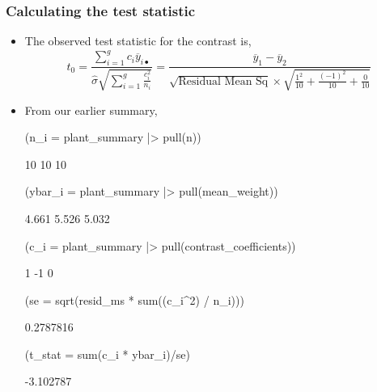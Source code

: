 \documentclass[a4paper]{article}\usepackage[]{graphicx}\usepackage[]{xcolor}
\begin{document}
\subsubsection{Calculating the test statistic}
\begin{itemize}
	\item The observed test statistic for the contrast is,
	\[
		t_0 = \frac{\sum_{i=1}^gc_i\overline y_{i\bullet}}{\hat\sigma\sqrt{\sum_{i=1}^g \frac{c_i^2}{n_i}}} = \frac{\overline{y}_1 - \overline{y}_2 }{\sqrt{\text{Residual Mean Sq}}\times \sqrt{\frac{1^2}{10} + \frac{(-1)^2}{10} + \frac{0}{10}}}
	\]
	\item From our earlier summary,
\begin{Schunk}
\begin{Sinput}
(n_i = plant_summary |> pull(n))
\end{Sinput}
\begin{Soutput}
[1] 10 10 10
\end{Soutput}
\begin{Sinput}
(ybar_i = plant_summary |> pull(mean_weight))
\end{Sinput}
\begin{Soutput}
[1] 4.661 5.526 5.032
\end{Soutput}
\begin{Sinput}
(c_i =  plant_summary |> pull(contrast_coefficients))
\end{Sinput}
\begin{Soutput}
[1]  1 -1  0
\end{Soutput}
\begin{Sinput}
(se = sqrt(resid_ms * sum((c_i^2) / n_i)))
\end{Sinput}
\begin{Soutput}
[1] 0.2787816
\end{Soutput}
\begin{Sinput}
(t_stat = sum(c_i * ybar_i)/se)
\end{Sinput}
\begin{Soutput}
[1] -3.102787
\end{Soutput}
\end{Schunk}
\end{itemize}
\end{document}

